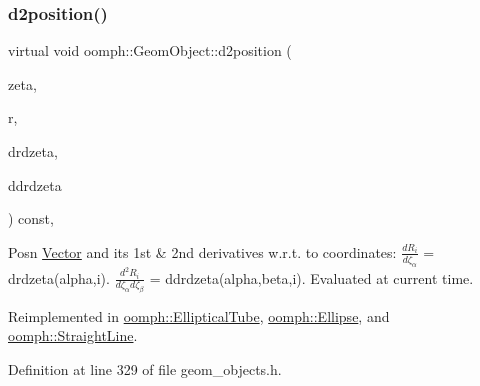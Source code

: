 \mbox{\label{classoomph_1_1GeomObject_a4fdbd372e26d4486026c06dcfdaafe81}} 
\subsubsection{\texorpdfstring{d2position()}{d2position()}\hspace{0.1cm}{\footnotesize\ttfamily [2/2]}}
{\footnotesize\ttfamily virtual void oomph\+::\+Geom\+Object\+::d2position (\begin{DoxyParamCaption}\item[{const \hyperlink{classoomph_1_1Vector}{Vector}$<$ double $>$ \&}]{zeta,  }\item[{\hyperlink{classoomph_1_1Vector}{Vector}$<$ double $>$ \&}]{r,  }\item[{\hyperlink{classoomph_1_1DenseMatrix}{Dense\+Matrix}$<$ double $>$ \&}]{drdzeta,  }\item[{\hyperlink{classoomph_1_1RankThreeTensor}{Rank\+Three\+Tensor}$<$ double $>$ \&}]{ddrdzeta }\end{DoxyParamCaption}) const\hspace{0.3cm}{\ttfamily [inline]}, {\ttfamily [virtual]}}



Posn \hyperlink{classoomph_1_1Vector}{Vector} and its 1st \& 2nd derivatives w.\+r.\+t. to coordinates\+: $ \frac{dR_i}{d \zeta_\alpha}$ = drdzeta(alpha,i). $ \frac{d^2R_i}{d \zeta_\alpha d \zeta_\beta}$ = ddrdzeta(alpha,beta,i). Evaluated at current time. 



Reimplemented in \hyperlink{classoomph_1_1EllipticalTube_a2fe694a504750371d3ef98a20b92e6a5}{oomph\+::\+Elliptical\+Tube}, \hyperlink{classoomph_1_1Ellipse_a5cf7ea86ce09f7371e03fea52395cf3b}{oomph\+::\+Ellipse}, and \hyperlink{classoomph_1_1StraightLine_aa7469f6d75ced06789bb094eef5a9c64}{oomph\+::\+Straight\+Line}.



Definition at line 329 of file geom\+\_\+objects.\+h.

\mbox{\label{classoomph_1_1GeomObject_a91cd59efcb15971a293914b7b9bd7f75}} 
